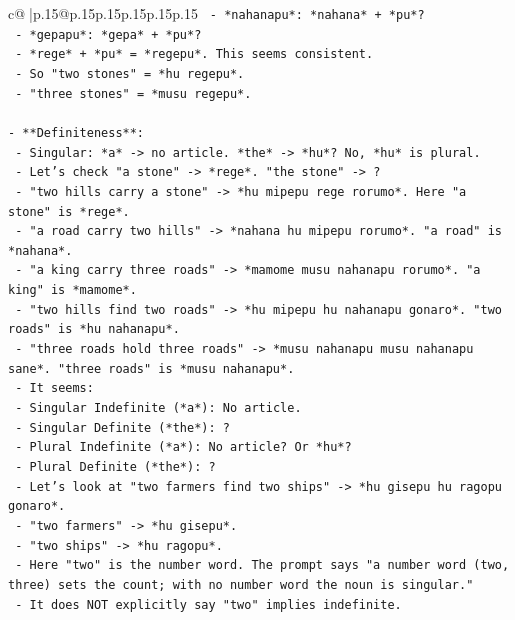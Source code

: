 \documentclass{article}
\begin{document}
{\begin{supertabular}{c@{$\;$}|p{.15\linewidth}@{}p{.15\linewidth}p{.15\linewidth}p{.15\linewidth}p{.15\linewidth}p{.15\linewidth}}
{{{\texttt{        {-} *nahanapu*: *nahana* + *pu*?} \\
\texttt{        {-} *gepapu*: *gepa* + *pu*?} \\
\texttt{        {-} *rege* + *pu* = *regepu*. This seems consistent.} \\
\texttt{        {-} So "two stones" = *hu regepu*.} \\
\texttt{        {-} "three stones" = *musu regepu*.} \\
\\ 
\texttt{{-} **Definiteness**:} \\
\texttt{  {-} Singular: *a* {-}> no article. *the* {-}> *hu*? No, *hu* is plural.} \\
\texttt{  {-} Let's check "a stone" {-}> *rege*. "the stone" {-}> ?} \\
\texttt{  {-} "two hills carry a stone" {-}> *hu mipepu rege rorumo*. Here "a stone" is *rege*.} \\
\texttt{  {-} "a road carry two hills" {-}> *nahana hu mipepu rorumo*. "a road" is *nahana*.} \\
\texttt{  {-} "a king carry three roads" {-}> *mamome musu nahanapu rorumo*. "a king" is *mamome*.} \\
\texttt{  {-} "two hills find two roads" {-}> *hu mipepu hu nahanapu gonaro*. "two roads" is *hu nahanapu*.} \\
\texttt{  {-} "three roads hold three roads" {-}> *musu nahanapu musu nahanapu sane*. "three roads" is *musu nahanapu*.} \\
\texttt{  {-} It seems:} \\
\texttt{    {-} Singular Indefinite (*a*): No article.} \\
\texttt{    {-} Singular Definite (*the*): ?} \\
\texttt{    {-} Plural Indefinite (*a*): No article? Or *hu*?} \\
\texttt{    {-} Plural Definite (*the*): ?} \\
\texttt{  {-} Let's look at "two farmers find two ships" {-}> *hu gisepu hu ragopu gonaro*.} \\
\texttt{    {-} "two farmers" {-}> *hu gisepu*.} \\
\texttt{    {-} "two ships" {-}> *hu ragopu*.} \\
\texttt{    {-} Here "two" is the number word. The prompt says "a number word (two, three) sets the count; with no number word the noun is singular."} \\
\texttt{    {-} It does NOT explicitly say "two" implies indefinite.} \\
}}}
\end{supertabular}}
\end{document}
